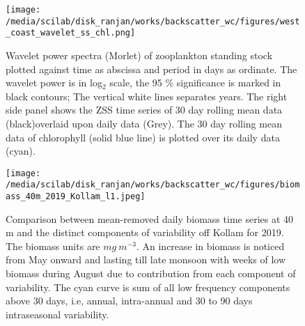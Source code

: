 \documentclass{article}
\begin{document}
\begin{figure}[htbp]
	\centering
	\texttt{[image: /media/scilab/disk\_ranjan/works/backscatter\_wc/figures/west\_coast\_wavelet\_ss\_chl.png]} 
	\captionsetup{justification=justified,font=footnotesize,skip=0.05\baselineskip,width=\textwidth}
	\caption{Wavelet power spectra (Morlet) of zooplankton standing stock plotted against time as abscissa and period in days as ordinate. The wavelet power is in log$_2$ scale, the 95 \% significance is marked in black contours; The vertical white lines separates years. The right side panel shows the ZSS time series of 30 day rolling mean data (black)overlaid upon daily data (Grey). The 30 day rolling mean data of chlorophyll (solid blue line) is plotted over its daily data (cyan).}
	\label{fig:wavess}
\end{figure}




\begin{figure}[htbp]
	\centering
	\texttt{[image: /media/scilab/disk\_ranjan/works/backscatter\_wc/figures/biomass\_40m\_2019\_Kollam\_l1.jpeg]} 
	\captionsetup{justification=justified,font=footnotesize,skip=0.05\baselineskip,width=\textwidth}
	\caption{Comparison between mean-removed daily biomass time series at 40 m and the distinct components of variability off Kollam for 2019. The biomass units are $mg \ m^{-3}$. An increase in biomass is noticed from May onward and lasting till late monsoon with weeks of low biomass during August due to contribution from each component of variability. The cyan curve is sum of all low frequency components above 30 days, i.e, annual, intra-annual and 30 to 90 days intraseasonal variability.}
	\label{fig:variability}
\end{figure}
\end{document}
